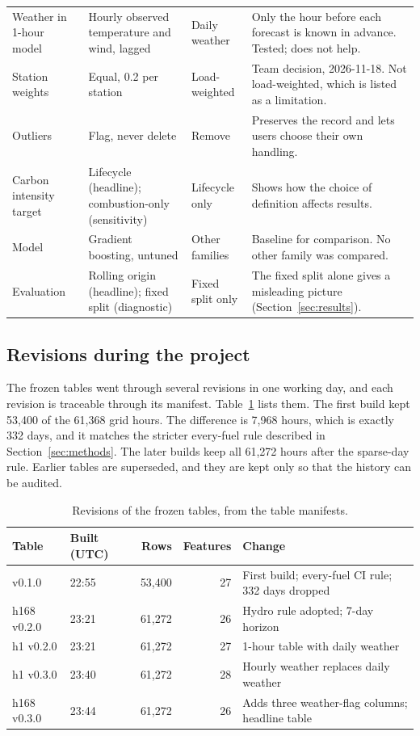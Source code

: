 \documentclass[10pt,journal,compsoc]{IEEEtran}
\begin{document}
\begin{table}[t]
\begin{tabular}{@{}p{2.8cm}p{3.6cm}p{3.6cm}p{5.4cm}@{}}
Weather in 1-hour model & Hourly observed temperature and wind, lagged & Daily weather & Only the hour before each forecast is known in advance. Tested; does not help. \\
Station weights & Equal, 0.2 per station & Load-weighted & Team decision, 2026-11-18. Not load-weighted, which is listed as a limitation. \\
Outliers & Flag, never delete & Remove & Preserves the record and lets users choose their own handling. \\
Carbon intensity target & Lifecycle (headline); combustion-only (sensitivity) & Lifecycle only & Shows how the choice of definition affects results. \\
Model & Gradient boosting, untuned & Other families & Baseline for comparison. No other family was compared. \\
Evaluation & Rolling origin (headline); fixed split (diagnostic) & Fixed split only & The fixed split alone gives a misleading picture (Section~\ref{sec:results}). \\
\bottomrule
\end{tabular}
\end{table}

\subsection{Revisions during the project}
The frozen tables went through several revisions in one working day, and each revision is traceable through its manifest. Table~\ref{tab:revisions} lists them. The first build kept 53,400 of the 61,368 grid hours. The difference is 7,968 hours, which is exactly 332 days, and it matches the stricter every-fuel rule described in Section~\ref{sec:methods}. The later builds keep all 61,272 hours after the sparse-day rule. Earlier tables are superseded, and they are kept only so that the history can be audited.

\begin{table}[t]
\caption{Revisions of the frozen tables, from the table manifests.}
\label{tab:revisions}
\centering
\small
\begin{tabular}{@{}p{2.2cm}p{2.0cm}rrp{6.0cm}@{}}
\toprule
Table & Built (UTC) & Rows & Features & Change \\
\midrule
v0.1.0 & 22:55 & 53,400 & 27 & First build; every-fuel CI rule; 332 days dropped \\
h168 v0.2.0 & 23:21 & 61,272 & 26 & Hydro rule adopted; 7-day horizon \\
h1 v0.2.0 & 23:21 & 61,272 & 27 & 1-hour table with daily weather \\
h1 v0.3.0 & 23:40 & 61,272 & 28 & Hourly weather replaces daily weather \\
h168 v0.3.0 & 23:44 & 61,272 & 26 & Adds three weather-flag columns; headline table \\
\bottomrule
\end{tabular}
\end{table}
\end{document}
